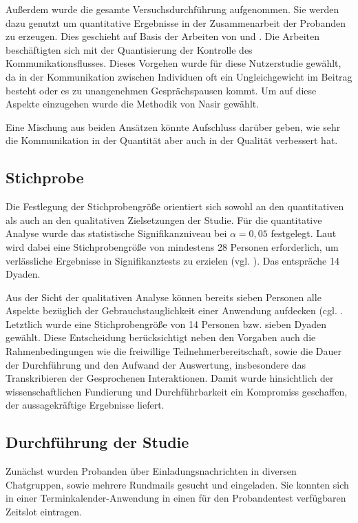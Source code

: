 Außerdem wurde die gesamte Versuchsdurchführung aufgenommen. Sie werden dazu genutzt um quantitative Ergebnisse in der Zusammenarbeit der Probanden zu erzeugen. Dies geschieht auf Basis der Arbeiten von \cite{nasir_cooperative_2013} und \cite{nasir_effect_2015}. Die Arbeiten beschäftigten sich mit der Quantisierung der Kontrolle des Kommunikationsflusses. Dieses Vorgehen wurde für diese Nutzerstudie gewählt, da in der Kommunikation zwischen Individuen oft ein Ungleichgewicht im Beitrag besteht oder es zu unangenehmen Gesprächspausen kommt. Um auf diese Aspekte einzugehen wurde die Methodik von Nasir gewählt.

Eine Mischung aus beiden Ansätzen könnte Aufschluss darüber geben, wie sehr die Kommunikation in der Quantität aber auch in der Qualität verbessert hat.

\subsection{Stichprobe}
Die Festlegung der Stichprobengröße orientiert sich sowohl an den quantitativen als auch an den qualitativen Zielsetzungen der Studie. Für die quantitative Analyse wurde das statistische Signifikanzniveau bei $\alpha = 0,05$ festgelegt. Laut \cite{cohen_power_1992} wird dabei eine Stichprobengröße von mindestens 28 Personen erforderlich, um verlässliche Ergebnisse in Signifikanztests zu erzielen (vgl. \cite[S. 158]{cohen_power_1992}). Das entspräche 14 Dyaden.

Aus der Sicht der qualitativen Analyse können bereits sieben Personen alle Aspekte bezüglich der Gebrauchstauglichkeit einer Anwendung aufdecken (cgl. \cite[S. 3088]{turner_determining_2006}. 
Letztlich wurde eine Stichprobengröße von 14 Personen bzw. sieben Dyaden gewählt. Diese Entscheidung berücksichtigt neben den Vorgaben auch die Rahmenbedingungen wie die freiwillige Teilnehmerbereitschaft, sowie die Dauer der Durchführung und den Aufwand der Auswertung, insbesondere das Transkribieren der Gesprochenen Interaktionen. Damit wurde hinsichtlich der wissenschaftlichen Fundierung und Durchführbarkeit ein Kompromiss geschaffen, der aussagekräftige Ergebnisse liefert.

\subsection{Durchführung der Studie}
Zunächst wurden Probanden über Einladungsnachrichten in diversen Chatgruppen, sowie mehrere Rundmails gesucht und eingeladen. Sie konnten sich in einer Terminkalender-Anwendung in einen für den Probandentest verfügbaren Zeitslot eintragen.


